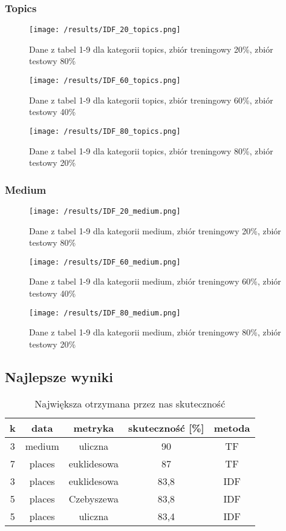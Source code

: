 \documentclass{classrep}
\begin{document}
\subsubsection{Topics}
\begin{figure}[H]
	\centering
	\texttt{[image: /results/IDF\_20\_topics.png]}
	\caption{Dane z tabel 1-9 dla kategorii topics, zbiór treningowy 20\%, zbiór testowy 80\%}
\end{figure}
\begin{figure}[H]
	\centering
	\texttt{[image: /results/IDF\_60\_topics.png]}
	\caption{Dane z tabel 1-9 dla kategorii topics, zbiór treningowy 60\%, zbiór testowy 40\%}
\end{figure}
\begin{figure}[H]
	\centering
	\texttt{[image: /results/IDF\_80\_topics.png]}
	\caption{Dane z tabel 1-9 dla kategorii topics, zbiór treningowy 80\%, zbiór testowy 20\%}
\end{figure}
\subsubsection{Medium}
\begin{figure}[H]
	\centering
	\texttt{[image: /results/IDF\_20\_medium.png]}
	\caption{Dane z tabel 1-9 dla kategorii medium, zbiór treningowy 20\%, zbiór testowy 80\%}
\end{figure}
\begin{figure}[H]
	\centering
	\texttt{[image: /results/IDF\_60\_medium.png]}
	\caption{Dane z tabel 1-9 dla kategorii medium, zbiór treningowy 60\%, zbiór testowy 40\%}
\end{figure}
\begin{figure}[H]
	\centering
	\texttt{[image: /results/IDF\_80\_medium.png]}
	\caption{Dane z tabel 1-9 dla kategorii medium, zbiór treningowy 80\%, zbiór testowy 20\%}
\end{figure}

\subsection{Najlepsze wyniki}
\begin{table}[H]
	\centering
	\begin{tabular}{c c c c c} 
		\hline
		\textbf{k} & \textbf{data} & \textbf{metryka} &  \textbf{skuteczność [\%]} & \textbf{metoda} \\ [0.5ex] 
		\hline
		\hline 
			3 & medium & uliczna  & 90 & TF \\
			7 & places & euklidesowa  & 87 & TF \\
			3 & places & euklidesowa  & 83,8 & IDF \\
			5 & places & Czebyszewa  & 83,8 & IDF \\
			5 & places & uliczna & 83,4 & IDF \\
		\hline
	\end{tabular}
	\caption{Największa otrzymana przez nas skuteczność}
\end{table}
\end{document}
